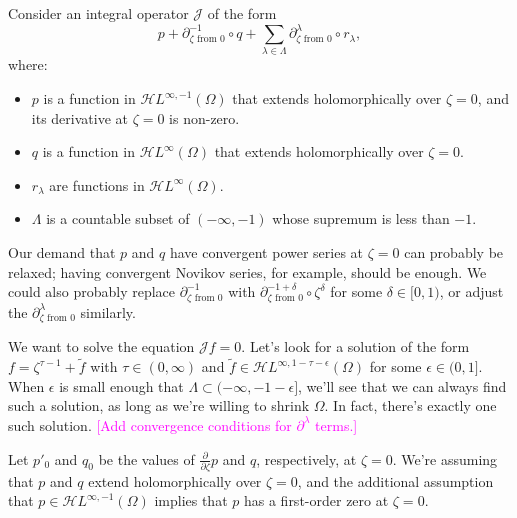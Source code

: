 \documentclass{article}
\newcommand{\holoL}[1]{\mathcal{H}L^{#1}} %
\begin{document}
Consider an integral operator $\mathcal{J}$ of the form
\[ p + \partial^{-1}_{\zeta \text{ from } 0} \circ q + \sum_{\lambda \in \Lambda} \partial^\lambda_{\zeta \text{ from } 0} \circ r_\lambda, \]
where:
\begin{itemize}
\item $p$ is a function in $\holoL{\infty, -1}(\Omega)$ that extends holomorphically over $\zeta = 0$, and its derivative at $\zeta = 0$ is non-zero.
\item $q$ is a function in $\holoL{\infty}(\Omega)$ that extends holomorphically over $\zeta = 0$.
\item $r_\lambda$ are functions in $\holoL{\infty}(\Omega)$.
\item $\Lambda$ is a countable subset of $(-\infty, -1)$ whose supremum is less than $-1$.
\end{itemize}
Our demand that $p$ and $q$ have convergent power series at $\zeta = 0$ can probably be relaxed; having convergent Novikov series, for example, should be enough. We could also probably replace $\partial^{-1}_{\zeta \text{ from } 0}$ with $\partial^{-1+\delta}_{\zeta \text{ from } 0} \circ \zeta^\delta$ for some $\delta \in [0, 1)$, or adjust the $\partial^\lambda_{\zeta \text{ from } 0}$ similarly.

We want to solve the equation $\mathcal{J}f = 0$. Let's look for a solution of the form $f = \zeta^{\tau-1} + \tilde{f}$ with $\tau \in (0, \infty)$ and $\tilde{f} \in \holoL{\infty, 1-\tau-\epsilon}(\Omega)$ for some $\epsilon \in (0, 1]$. When $\epsilon$ is small enough that $\Lambda \subset (-\infty, -1 - \epsilon]$, we'll see that we can always find such a solution, as long as we're willing to shrink $\Omega$. In fact, there's exactly one such solution. \textcolor{magenta}{[Add convergence conditions for $\partial^\lambda$ terms.]}

Let $p'_0$ and $q_0$ be the values of $\tfrac{\partial}{\partial \zeta} p$ and $q$, respectively, at $\zeta = 0$. We're assuming that $p$ and $q$ extend holomorphically over $\zeta = 0$, and the additional assumption that $p \in \holoL{\infty, -1}(\Omega)$ implies that $p$ has a first-order zero at $\zeta = 0$.
\end{document}

